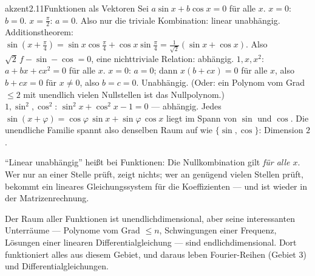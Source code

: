 \begin{loesungkarte}{akzent}{2.11}{Funktionen als Vektoren}
Sei $a\sin x + b\cos x = 0$ für alle $x$. $x = 0$: $b = 0$. $x = \frac\pi2$: $a = 0$. Also nur die triviale Kombination: linear unabhängig.
Additionstheorem: $\sin(x + \frac\pi4) = \sin x\cos\frac\pi4 + \cos x\sin\frac\pi4 = \frac1{\sqrt2}(\sin x + \cos x)$. Also $\sqrt2\,f - \sin - \cos = 0$, eine nichttriviale Relation: abhängig.
$1, x, x^{2}$: $a + bx + cx^{2} = 0$ für alle $x$. $x = 0$: $a = 0$; dann $x(b + cx) = 0$ für alle $x$, also $b + cx = 0$ für $x\neq0$, also $b = c = 0$. Unabhängig. (Oder: ein Polynom vom Grad $\le2$ mit unendlich vielen Nullstellen ist das Nullpolynom.) \\
$1, \sin^{2}, \cos^{2}$: $\sin^{2}x + \cos^{2}x - 1 = 0$ --- abhängig.
Jedes $\sin(x + \varphi) = \cos\varphi\,\sin x + \sin\varphi\,\cos x$ liegt im Spann von $\sin$ und $\cos$. Die unendliche Familie spannt also denselben Raum auf wie $\{\sin, \cos\}$: Dimension $2$.
\begin{fehler}\kastentext
\enquote{Linear unabhängig} heißt bei Funktionen: Die Nullkombination gilt \emph{für alle $x$}. Wer nur an einer Stelle prüft, zeigt nichts; wer an genügend vielen Stellen prüft, bekommt ein lineares Gleichungssystem für die Koeffizienten --- und ist wieder in der Matrizenrechnung.
\end{fehler}
\begin{mitnehmen}\kastentext
Der Raum aller Funktionen ist unendlichdimensional, aber seine interessanten Unterräume --- Polynome vom Grad $\le n$, Schwingungen einer Frequenz, Lösungen einer linearen Differentialgleichung --- sind endlichdimensional. Dort funktioniert alles aus diesem Gebiet, und daraus leben Fourier-Reihen (Gebiet 3) und Differentialgleichungen.
\end{mitnehmen}
\end{loesungkarte}

